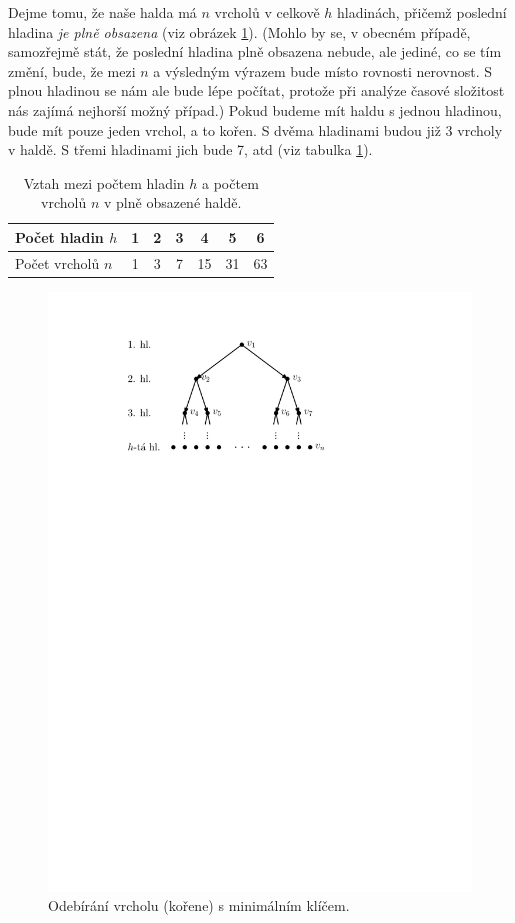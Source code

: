 Dejme tomu, že naše halda má $n$ vrcholů v celkově $h$ hladinách, přičemž poslední hladina \emph{je plně obsazena} (viz obrázek \ref{fig:halda_hladiny}). (Mohlo by se, v obecném případě, samozřejmě stát, že poslední hladina plně obsazena nebude, ale jediné, co se tím změní, bude, že mezi $n$ a výsledným výrazem bude místo rovnosti nerovnost. S plnou hladinou se nám ale bude lépe počítat, protože při analýze časové složitost nás zajímá nejhorší možný případ.) Pokud budeme mít haldu s jednou hladinou, bude mít pouze jeden vrchol, a to kořen. S dvěma hladinami budou již 3 vrcholy v haldě. S třemi hladinami jich bude 7, atd (viz tabulka \ref{tab:halda_vrcholy_hladiny}).
\begin{table}[h]
    \centering
    \begin{tabular}{|l|c|c|c|c|c|c|}
        \hline
        Počet hladin $h$  & 1 & 2 & 3 & 4  & 5  & 6  \\ \hline
        Počet vrcholů $n$ & 1 & 3 & 7 & 15 & 31 & 63 \\ \hline
    \end{tabular}
    \caption{Vztah mezi počtem hladin $h$ a počtem vrcholů $n$ v plně obsazené haldě.}
    \label{tab:halda_vrcholy_hladiny}
\end{table}
\begin{figure}[h]
    \centering
    \includegraphics[scale=0.75]{01-grafalgo/images/ch01_halda_hladiny}
    \caption{Odebírání vrcholu (kořene) s minimálním klíčem.}
    \label{fig:halda_hladiny}
\end{figure}
